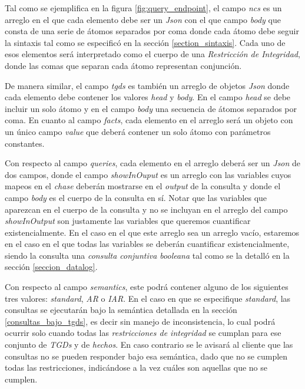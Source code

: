 \documentclass[11pt,a4paper,twoside]{tesis}
\begin{document}
Tal como se ejemplifica en la figura \ref{fig:query_endpoint}, el campo \textit{ncs} es un arreglo en el que cada elemento debe ser un \textit{Json} con el que campo \textit{body} que consta de una serie de átomos separados por coma donde cada átomo debe seguir la sintaxis tal como se especificó en la sección \ref{section_sintaxis}. Cada uno de esos elementos será interpretado como el cuerpo de una \textit{Restricción de Integridad}, donde las comas que separan cada átomo representan conjunción.

De manera similar, el campo \textit{tgds} es también un arreglo de objetos \textit{Json} donde cada elemento debe contener los valores \textit{head} y \textit{body}.  En el campo \textit{head} se debe incluir un solo átomo y en el campo \textit{body} una secuencia de átomos separados por coma. En cuanto al campo \textit{facts}, cada elemento en el arreglo será un objeto con un único campo \textit{value} que deberá contener un solo átomo con parámetros constantes.

Con respecto al campo \textit{queries}, cada elemento en el arreglo deberá ser un \textit{Json} de dos campos, donde el campo \textit{showInOuput} es un arreglo con las variables cuyos mapeos en el \textit{chase} deberán mostrarse en el \textit{output} de la consulta y donde el campo \textit{body} es el cuerpo de la consulta en sí. Notar que las variables que aparezcan en el cuerpo de la consulta y no se incluyan en el arreglo del campo \textit{showInOutput} son justamente las variables que queremos cuantificar existencialmente. En el caso en el que este arreglo sea un arreglo vacío, estaremos en el caso en el que todas las variables se deberán cuantificar existencialmente, siendo la consulta una \textit{consulta conjuntiva booleana} tal como se la detalló en la sección \ref{seccion_datalog}.
    
Con respecto al campo \textit{semantics}, este podrá contener alguno de los siguientes tres valores: \textit{standard}, \textit{AR} o \textit{IAR}. En el caso en que se especifique \textit{standard}, las consultas se ejecutarán bajo la semántica detallada en la sección \ref{consultas_bajo_tgds}, es decir sin manejo de inconsistencia, lo cual podrá ocurrir solo cuando todas las \textit{restricciones de integridad} se cumplan para ese conjunto de \textit{TGDs} y de \textit{hechos}. En caso contrario se le avisará al cliente que las consultas no se pueden responder bajo esa semántica, dado que no se cumplen todas las restricciones, indicándose a la vez cuáles son aquellas que no se cumplen.
\end{document}
